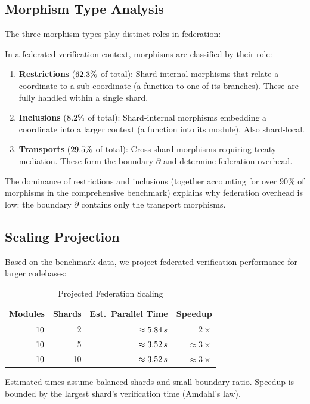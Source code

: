 \documentclass[11pt]{article}
\begin{document}
\subsection{Morphism Type Analysis}

The three morphism types play distinct roles in federation:

\begin{definition}\label{def:morph-roles}
In a federated verification context, morphisms are classified by their
role:
\begin{enumerate}[noitemsep]
  \item \textbf{Restrictions} ($62.3\%$ of total):
        Shard-internal morphisms that relate a coordinate to a
        sub-coordinate (\eg a function to one of its branches).
        These are fully handled within a single shard.
  \item \textbf{Inclusions} ($8.2\%$ of total):
        Shard-internal morphisms embedding a coordinate into a larger
        context (\eg a function into its module).  Also shard-local.
  \item \textbf{Transports} ($29.5\%$ of total):
        Cross-shard morphisms requiring treaty mediation.  These
        form the boundary $\partial$ and determine federation
        overhead.
\end{enumerate}
\end{definition}

The dominance of restrictions and inclusions (together accounting for
over $90\%$ of morphisms in the comprehensive benchmark) explains
why federation overhead is low: the boundary $\partial$ contains only
the transport morphisms.

\subsection{Scaling Projection}

Based on the benchmark data, we project federated verification
performance for larger codebases:

\begin{table}[H]
\centering
\caption{Projected Federation Scaling}
\label{tab:scaling-projection}
\begin{tabular}{rrrr}
\toprule
\textbf{Modules} & \textbf{Shards} & \textbf{Est.\ Parallel Time}
  & \textbf{Speedup} \\
\midrule
$10$ & 2  & $\approx 5.84\,s$ & $2\times$ \\
$10$ & 5  & $\approx 3.52\,s$ & $\approx 3\times$ \\
$10$ & 10 & $\approx 3.52\,s$ & $\approx 3\times$ \\
\bottomrule
\end{tabular}
\smallskip

{\footnotesize Estimated times assume balanced shards and small
boundary ratio. Speedup is bounded by the largest shard's
verification time (Amdahl's law).}
\end{table}
\end{document}
